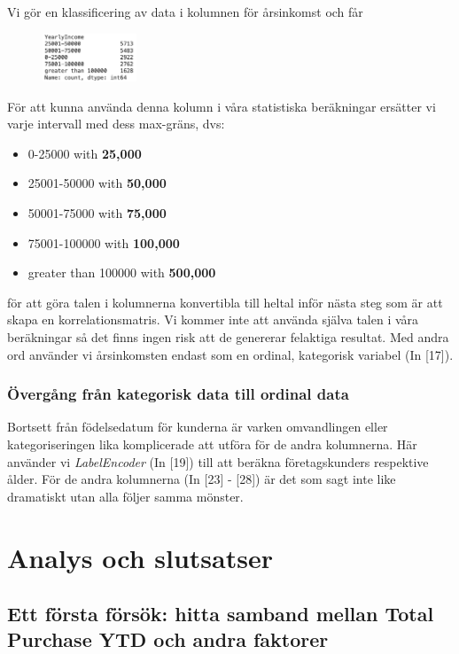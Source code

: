 \documentclass[10pt]{article}
\begin{document}
Vi gör en klassificering av data i kolumnen för årsinkomst och får
\begin{figure}[h]
    \centering
    \includegraphics[width=0.25\textwidth]{img_yearly_income.png}
\end{figure}

För att kunna använda denna kolumn i våra statistiska beräkningar ersätter vi varje intervall med dess max-gräns, dvs:
\begin{itemize}[topsep=10pt, partopsep=0pt, itemsep=0.2em, parsep=0pt]
	\item[] 0-25000 with \textbf{25,000}
	\item[] 25001-50000 with \textbf{50,000}
	\item[] 50001-75000 with \textbf{75,000}
	\item[] 75001-100000 with \textbf{100,000}
	\item[] greater than 100000 with \textbf{500,000}
\end{itemize}
för att göra talen i kolumnerna konvertibla till heltal inför nästa steg som är att skapa en korrelationsmatris. Vi kommer inte att använda själva talen i våra beräkningar så det finns ingen risk att de genererar felaktiga resultat. Med andra ord använder vi årsinkomsten endast som en ordinal, kategorisk variabel (In [17]).

\subsubsection{Övergång från kategorisk data till ordinal data}

Bortsett från födelsedatum för kunderna är varken omvandlingen eller kategoriseringen lika komplicerade att utföra för de andra kolumnerna. Här använder vi \emph{LabelEncoder}  (In [19]) till att beräkna företagskunders respektive ålder. För de andra kolumnerna (In [23] - [28]) är det som sagt inte like dramatiskt utan alla följer samma mönster.

\section{Analys och slutsatser}

\subsection{Ett första försök: hitta samband mellan Total Purchase YTD och andra faktorer}
\end{document}
